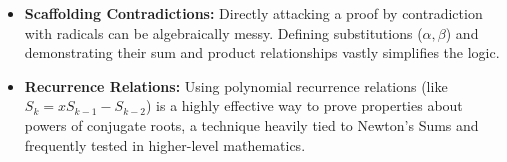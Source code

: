 \begin{takeaways}
\begin{itemize}
    \item \textbf{Scaffolding Contradictions:} Directly attacking a proof by contradiction with radicals can be algebraically messy. Defining substitutions ($\alpha, \beta$) and demonstrating their sum and product relationships vastly simplifies the logic.
    \item \textbf{Recurrence Relations:} Using polynomial recurrence relations (like $S_k = xS_{k-1} - S_{k-2}$) is a highly effective way to prove properties about powers of conjugate roots, a technique heavily tied to Newton's Sums and frequently tested in higher-level mathematics.
\end{itemize}
\end{takeaways}
